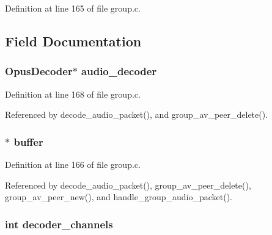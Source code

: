 Definition at line 165 of file group.\+c.



\subsection{Field Documentation}
\hypertarget{struct_group___peer___a_v_a3b9ee5ac4c354a3e31a8acf7aa1a1b6c}{
\subsubsection[{audio\+\_\+decoder}]{\setlength{\rightskip}{0pt plus 5cm}Opus\+Decoder$\ast$ audio\+\_\+decoder}}\label{struct_group___peer___a_v_a3b9ee5ac4c354a3e31a8acf7aa1a1b6c}


Definition at line 168 of file group.\+c.



Referenced by decode\+\_\+audio\+\_\+packet(), and group\+\_\+av\+\_\+peer\+\_\+delete().

\hypertarget{struct_group___peer___a_v_a6552b703c2e3958d1e030416f2893b27}{
\subsubsection[{buffer}]{$\ast$ buffer}}\label{struct_group___peer___a_v_a6552b703c2e3958d1e030416f2893b27}


Definition at line 166 of file group.\+c.



Referenced by decode\+\_\+audio\+\_\+packet(), group\+\_\+av\+\_\+peer\+\_\+delete(), group\+\_\+av\+\_\+peer\+\_\+new(), and handle\+\_\+group\+\_\+audio\+\_\+packet().

\hypertarget{struct_group___peer___a_v_afe1ef0788c8c4a05e136d1b00245138e}{
\subsubsection[{decoder\+\_\+channels}]{\setlength{\rightskip}{0pt plus 5cm}int decoder\+\_\+channels}}\label{struct_group___peer___a_v_afe1ef0788c8c4a05e136d1b00245138e}


